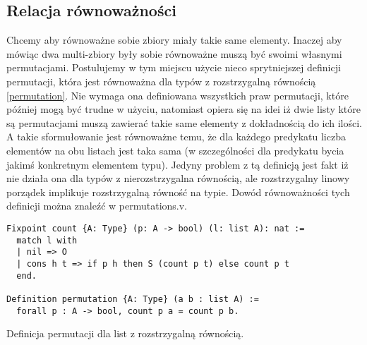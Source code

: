 \subsection{Relacja równoważności}
Chcemy aby równoważne sobie zbiory miały takie same elementy. Inaczej aby mówiąc dwa multi-zbiory były sobie równoważne muszą być swoimi własnymi permutacjami. Postulujemy w tym miejscu użycie nieco sprytniejszej definicji permutacji, która jest równoważna dla typów z rozstrzygalną równością \ref{permutation}. Nie wymaga ona definiowana wszystkich praw permutacji, które później mogą być trudne w użyciu, natomiast opiera się na idei iż dwie listy które są permutacjami muszą zawierać takie same elementy z dokładnością do ich ilości. A takie sformułowanie jest równoważne temu, że dla każdego predykatu liczba elementów na obu listach jest taka sama (w szczególności dla predykatu bycia jakimś konkretnym elementem typu). Jedyny problem z tą definicją jest fakt iż nie działa ona dla typów z nierozstrzygalna równością, ale rozstrzygalny linowy porządek implikuje rozstrzygalną równość na typie. Dowód równoważności tych definicji można znaleźć w permutations.v. 
\begin{code}
\begin{verbatim}
Fixpoint count {A: Type} (p: A -> bool) (l: list A): nat :=
  match l with
  | nil => O
  | cons h t => if p h then S (count p t) else count p t
  end.

Definition permutation {A: Type} (a b : list A) :=
  forall p : A -> bool, count p a = count p b.
\end{verbatim}
\caption{Definicja permutacji dla list z rozstrzygalną równością.}
\label{permutation}
\end{code}
